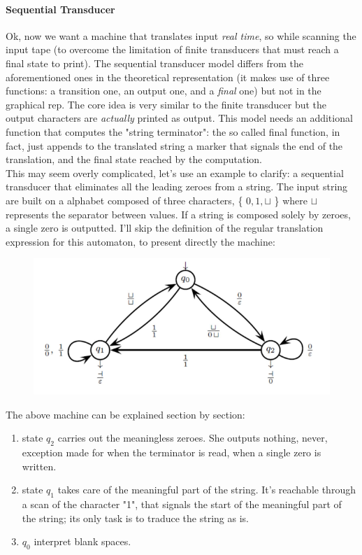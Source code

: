 \documentclass[10pt,a4paper]{article}
\begin{document}
					\paragraph{Sequential Transducer}
						Ok, now we want a machine that translates input \emph{real time}, so while scanning the input tape (to overcome the limitation of finite transducers that must reach a final state to print). The sequential transducer model differs from the aforementioned ones in the theoretical representation (it makes use of three functions: a transition one, an output one, and a \emph{final} one) but not in the graphical rep. The core idea is very similar to the finite transducer but the output characters are \emph{actually} printed as output. This model needs an additional function that computes the "string terminator": the so called final function, in fact, just appends to the translated string a marker that signals the end of the translation, and the final state reached by the computation.\\
						This may seem overly complicated, let's use an example to clarify: a sequential transducer that eliminates all the leading zeroes from a string. The input string are built on a alphabet composed of three characters, \{ $0, 1, \sqcup$ \} where $\sqcup$ represents the separator between values. If a string is composed solely by zeroes, a single zero is outputted.
						I'll skip the definition of the regular translation expression for this automaton, to present directly the machine:
						\begin{figure}[H]
							\centering
							\includegraphics[width = \textwidth]{./images/SeqTrans.png}
						\end{figure}
						The above machine can be explained section by section:
						\begin{enumerate}
							\item state $q_2$ carries out the meaningless zeroes. She outputs nothing, never, exception made for when the terminator is read, when a single zero is written. 
							\item state $q_1$ takes care of the meaningful part of the string. It's reachable through a scan of the character "1", that signals the start of the meaningful part of the string; its only task is to traduce the string as is.
							\item $q_0$ interpret blank spaces. 
						\end{enumerate}
						
\end{document}
